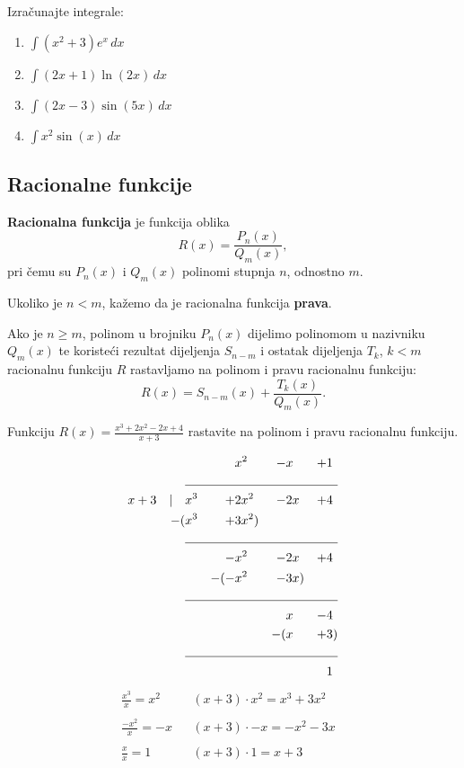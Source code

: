 \begin{example}
    Izračunajte integrale:
    \begin{enumerate}
        \item $\displaystyle \int (x^2+3)e^x\,dx$
        \item $\displaystyle \int (2x+1)\ln(2x)\,dx$
        \item $\displaystyle \int (2x-3)\sin(5x)\,dx$
        \item $\displaystyle \int x^2\sin(x)\,dx$
    \end{enumerate}
\end{example}

\subsection{Racionalne funkcije}

\textbf{Racionalna funkcija} je funkcija oblika
$$
R(x) = \frac{P_n(x)}{Q_m(x)},
$$
pri čemu su $P_n(x)$ i $Q_m(x)$ polinomi stupnja $n$, odnostno $m$.

Ukoliko je $n < m$, kažemo da je racionalna funkcija \textbf{prava}.

Ako je $n \geq m$, polinom u brojniku $P_n(x)$ dijelimo polinomom u nazivniku
$Q_m(x)$ te koristeći rezultat dijeljenja $S_{n-m}$ i ostatak dijeljenja $T_k$,
$k<m$ racionalnu funkciju $R$ rastavljamo na polinom i pravu racionalnu
funkciju:
$$
R(x) = S_{n-m}(x) + \frac{T_k(x)}{Q_m(x)}.
$$

\begin{example}
    Funkciju $R(x)=\frac{x^3+2x^2-2x+4}{x+3}$ rastavite na polinom i pravu
    racionalnu funkciju.
\end{example}

\begin{multicols}{2}
\begin{alignat*}{9}
                &&& x^2 &-& x &+& 1\\
                \cline{2-9}
x+3 \quad|\quad &x^3 &+& 2x^2 &-& 2x &+& 4 \\
                -(&x^3 &+& 3x^2)\\
                \cline{2-9}
                && -&x^2 &-&2x &+& 4 \\
                && -(-&x^2 &-& 3x) \\
                \cline{2-9}
                &&&&&x &-& 4\\
                &&&&-(&x &+& 3)\\
                \cline{2-9}
                &&&&&&&1
\end{alignat*}
\columnbreak
{}
\begin{align*}
    \frac{x^3}{x} = \boxed{x^2}&&(x+3)\cdot x^2 = \boxed{x^3 + 3x^2}&\\\\
    \frac{-x^2}{x} = \boxed{-x}&&(x+3)\cdot -x = \boxed{-x^2 - 3x}&\\\\
    \frac{x}{x} = \boxed{1}&&(x+3)\cdot 1 = \boxed{x+3}&\\
\end{align*}
\end{multicols}
